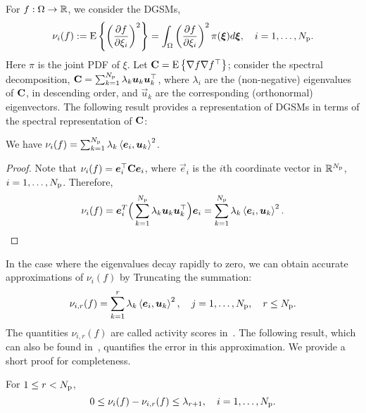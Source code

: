 For $f: \Omega \to \mathbb{R}$, we consider the DGSMs,
\[
    \nu_i(f) := \E{\left(\frac{\partial f}{\partial\xi_i}\right)^2} =
                  \int_\Omega 
                  \left(\frac{\partial f}{\partial\xi_i}\right)^2
                  \pi(\vec{\xi})d\vec{\xi}, \quad i = 1, \ldots, \Np.   
\]
Here $\pi$ is the joint PDF of $\xi$. 
Let $\mathbf{{C}} = \mathrm{E}\left\{{\nabla f \nabla f^\top} \right\}$; consider the spectral decomposition,
$\mat{C} = \sum_{k=1}^\Np \lambda_k \vec{u}_k \vec{u}_k^\top$, where
$\lambda_i$ are the (non-negative) eigenvalues of $\mathbf{{C}}$, in descending
order, and
$\vec{u}_k$ are the corresponding (orthonormal) eigenvectors. The following
result provides a representation of DGSMs in terms of the 
spectral representation of $\mathbf{{C}}$: 
\begin{lemma}
We have
$\nu_i(f) = \sum_{k=1}^\Np \lambda_k \ip{\vec{e}_i}{\vec{u}_k}^2$.
\end{lemma}
\begin{proof}
Note that $\nu_i(f) = \vec{e}_i^\top \mat{C} \vec{e}_i$,  
where $\vec{e}_i$ is the $i$th coordinate vector in $\mathbb{R}^{N_\text{p}}$, $i = 1, \ldots, {N_\text{p}}$.
Therefore,
\begin{equation}\label{equ:spectral_DGSM}
\nu_i(f) = \vec{e}_i^T \Big(\sum_{k=1}^\Np \lambda_k \vec{u}_k \vec{u}_k^\top\Big) \vec{e}_i
 = \sum_{k=1}^\Np \lambda_k \ip{\vec{e}_i}{\vec{u}_k}^2. 
\end{equation}
\end{proof}
In the case where the eigenvalues decay rapidly to zero, we can obtain
accurate approximations of $\nu_i(f)$ by Truncating the summation: 
\newcommand{\act}[3]{\nu_{{#2},{#3}}({#1})}
\newcommand{\actt}[3]{\tilde{\nu}_{{#2},{#3}}({#1})}
\[
   \act{f}{i}{r} =  \sum_{k=1}^r \lambda_k \ip{\vec{e}_i}{\vec{u}_k}^2,
   \quad j = 1, \ldots, \Np, \quad r \leq \Np.
\]
The quantities $\act{f}{i}{r}$ are called activity scores
in~\cite{Diaz:2016,Constantine:2017}.
The following result, which
can also be found in~\cite{Diaz:2016,Constantine:2017}, quantifies the error in this
approximation. We provide a short proof for completeness. 
\begin{proposition}\label{prp:dgsm_bound} 
For $1 \leq r < {N_\text{p}}$,
\[
0 \leq \nu_i(f) - \act{f}{i}{r} \leq \lambda_{r+1}, \quad i = 1, \ldots, \Np.
\] 
\end{proposition}
